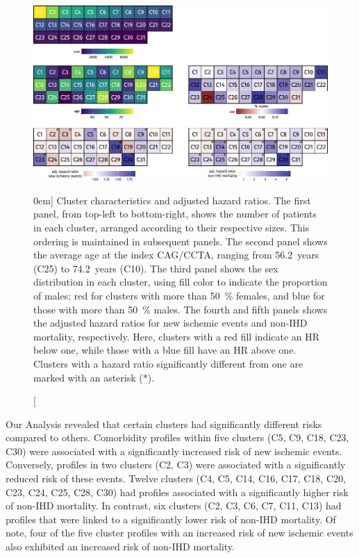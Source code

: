 \begin{figure}[t!]%
    \includegraphics{graphics/clustering-results.pdf}
    \caption[Cluster Characteristics and Outcomes][0em]{%
        Cluster characteristics and adjusted hazard ratios.
        The first panel,
        from top-left to bottom-right,
        shows the number
        of patients in each cluster, 
        arranged according to their respective sizes.
        This ordering is maintained in subsequent panels.
        The second panel shows the average age at the index \ac{CAG}/\ac{CCTA},
        ranging from \qty{56.2}{years} (C25) to \qty{74.2}{years} (C10).
        The third panel shows the sex distribution in each cluster,
        using fill color to indicate the proportion of males;
        red for clusters with more than \qty{50}{\percent} females,
        and blue for those with more than \qty{50}{\percent} males.
        The fourth and fifth panels shows the adjusted hazard ratios
        for new ischemic events and non-\ac{IHD} mortality, respectively.
        Here, clusters with a red fill indicate an \ac{HR} below one,
        while those with a blue fill have an \ac{HR} above one.
        Clusters with a hazard ratio significantly different from
        one are marked with an asterisk (\(*\)).
    }
    \label{fig:cluster-results}
\end{figure}%

Our Analysis revealed that
certain clusters had significantly different risks compared to others.
Comorbidity profiles within five clusters (C5, C9, C18, C23, C30) were
associated with a significantly increased risk of new ischemic events.
Conversely, profiles in two clusters (C2, C3) were associated with a 
significantly reduced risk of these events. 
Twelve clusters (C4, C5, C14, C16, C17, C18, C20, C23, C24, C25,
C28, C30) had profiles associated with a significantly higher risk 
of non-\ac{IHD} mortality. 
In contrast, six clusters (C2, C3, C6, C7, C11, C13) had
profiles that were linked to a significantly lower risk of 
non-\ac{IHD} mortality.
Of note, four of the five cluster profiles with an increased risk of 
new ischemic events also exhibited an increased risk of 
non-\ac{IHD} mortality. 


